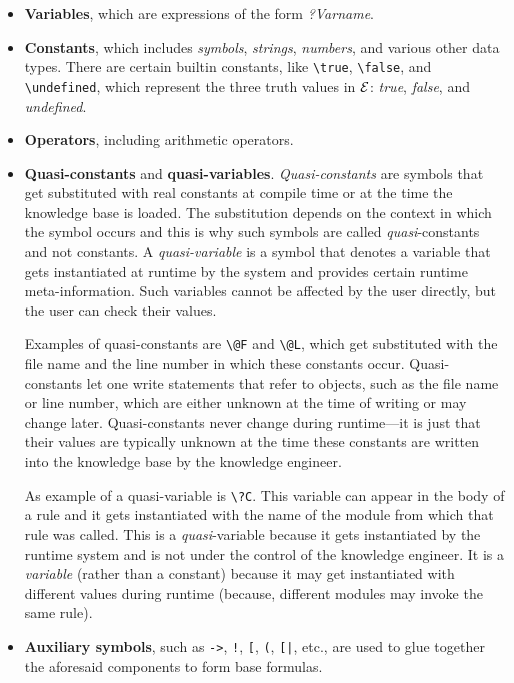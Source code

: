 \documentclass[11pt]{article}
\newcommand{\ERGO}{\mbox{\ensuremath{\cal{E}}\smaller{{\sc{RGO}}}}\xspace}
\newcommand{\FLSYSTEM}{\ERGO}
\newcommand{\bs}{\textbackslash}
\begin{document}
\begin{itemize}
\item  \textbf{Variables}, which are expressions of the form \emph{?Varname}.
  \index{\bs{}true}
  \index{\bs{}false}
  \index{\bs{}undefined}
\item  \textbf{Constants}, which includes \emph{symbols},  \emph{strings},
  \emph{numbers}, and various other data types.
  There are certain builtin constants, like \texttt{\bs{}true},
  \texttt{\bs{}false}, and \texttt{\bs{}undefined}, which represent the
  three truth values in \FLSYSTEM: \emph{true}, \emph{false}, and \emph{undefined}.    
\item \textbf{Operators}, including arithmetic operators.
\item \textbf{Quasi-constants} and
  \textbf{quasi-variables}. \emph{Quasi-constants}
  are symbols that get substituted
  with real constants at compile time or at the time the knowledge base is
  loaded. The substitution depends on the context in which the symbol
  occurs and this is why such symbols are called \emph{quasi}-constants and
  not constants. 
  A \emph{quasi-variable} is a symbol that denotes a variable that gets
  instantiated at runtime by the system and provides certain runtime
  meta-information. Such variables cannot be affected by the user directly,
  but the user can check their values.
  
  Examples of quasi-constants are \texttt{\bs{}@F} and \texttt{\bs{}@L},
  which get substituted with the file name and the line number in which
  these constants occur. Quasi-constants let one write
  statements that refer to objects, such as the file name or line
  number, which are either unknown at the time of writing or may change
  later.  Quasi-constants never change during runtime---it is just that
  their values are typically unknown at the time these constants are
  written into the knowledge base by the knowledge engineer.

  As example of a quasi-variable is \texttt{\bs{}?C}. This variable can
  appear in the body of a rule and it gets instantiated
  with the name of the module from which that rule was called. This is
  a \emph{quasi}-variable because it gets 
  instantiated by the runtime system and is not under the control of the
  knowledge engineer. It is a \emph{variable} (rather than a constant) because
  it may get instantiated with different values during runtime (because,
  different modules may invoke the same rule).
\item \textbf{Auxiliary symbols}, such as \texttt{->}, \texttt{!},
  \texttt{[}, \texttt{(}, \texttt{[|},   etc., are used to glue together     
  the aforesaid components to form base formulas.
\end{itemize}
\end{document}
